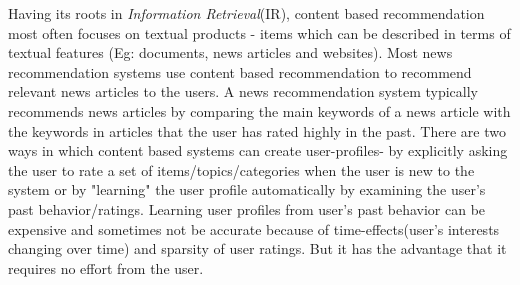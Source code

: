 Having its roots in \textit{Information Retrieval}(IR), content based recommendation most often focuses on textual products - items which can be described in terms of textual features (Eg: documents, news articles and websites).
Most news recommendation systems use content based recommendation to recommend relevant news articles to the users.
A news recommendation system typically recommends news articles by comparing the main keywords of a news article with the keywords in articles that the user has rated highly in the past.
There are two ways in which content based systems can create user-profiles- 
by explicitly asking the user to rate a set of items/topics/categories when the user is new to the system
or by "learning" the user profile automatically by examining the user's past behavior/ratings.
Learning user profiles from user's past behavior can be expensive and sometimes not be accurate because of time-effects(user's interests changing over time) and sparsity of user ratings.
But it has the advantage that it requires no effort from the user.


